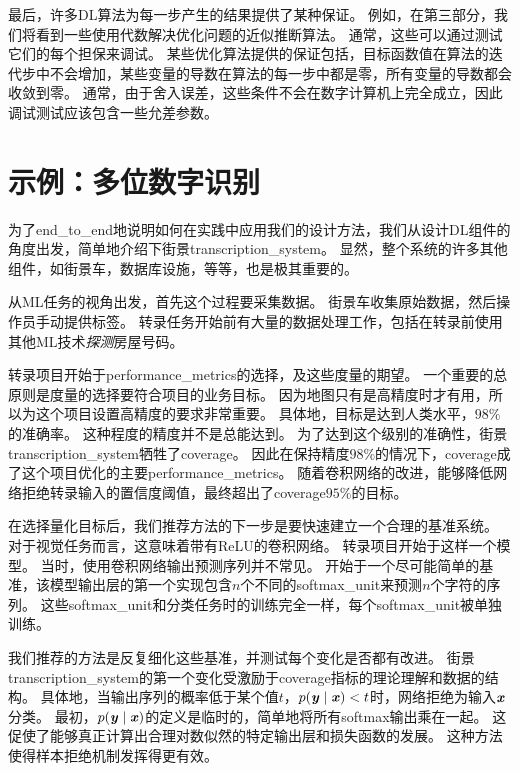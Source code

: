 
最后，许多\gls{DL}算法为每一步产生的结果提供了某种保证。
例如，在第三部分，我们将看到一些使用代数解决优化问题的近似推断算法。
通常，这些可以通过测试它们的每个担保来调试。
某些优化算法提供的保证包括，目标函数值在算法的迭代步中不会增加，某些变量的导数在算法的每一步中都是零，所有变量的导数都会收敛到零。
通常，由于舍入误差，这些条件不会在数字计算机上完全成立，因此调试测试应该包含一些允差参数。

\section{示例：多位数字识别}
\label{sec:example_multi_digit_number_recognition}
为了\gls{end_to_end}地说明如何在实践中应用我们的设计方法，我们从设计\gls{DL}组件的角度出发，简单地介绍下街景\gls{transcription_system}。
显然，整个系统的许多其他组件，如街景车，数据库设施，等等，也是极其重要的。

从\gls{ML}任务的视角出发，首先这个过程要采集数据。
街景车收集原始数据，然后操作员手动提供标签。
转录任务开始前有大量的数据处理工作，包括在转录前使用其他\gls{ML}技术\emph{探测}房屋号码。

转录项目开始于\gls{performance_metrics}的选择，及这些度量的期望。
一个重要的总原则是度量的选择要符合项目的业务目标。
因为地图只有是高精度时才有用，所以为这个项目设置高精度的要求非常重要。
具体地，目标是达到人类水平，$98\%$的准确率。
这种程度的精度并不是总能达到。
为了达到这个级别的准确性，街景\gls{transcription_system}牺牲了\gls{coverage}。
因此在保持精度$98\%$的情况下，\gls{coverage}成了这个项目优化的主要\gls{performance_metrics}。
随着卷积网络的改进，能够降低网络拒绝转录输入的置信度阈值，最终超出了\gls{coverage}$95\%$的目标。


在选择量化目标后，我们推荐方法的下一步是要快速建立一个合理的基准系统。
对于视觉任务而言，这意味着带有\gls{ReLU}的卷积网络。
转录项目开始于这样一个模型。
当时，使用卷积网络输出预测序列并不常见。
开始于一个尽可能简单的基准，该模型输出层的第一个实现包含$n$个不同的\gls{softmax_unit}来预测$n$个字符的序列。
这些\gls{softmax_unit}和分类任务时的训练完全一样，每个\gls{softmax_unit}被单独训练。


我们推荐的方法是反复细化这些基准，并测试每个变化是否都有改进。
街景\gls{transcription_system}的第一个变化受激励于\gls{coverage}指标的理论理解和数据的结构。
具体地，当输出序列的概率低于某个值$t$，$p(\boldsymbol{\mathit{y}}\mid\boldsymbol{\mathit{x}}) < t$时，网络拒绝为输入$\boldsymbol{\mathit{x}}$分类。
最初，$p(\boldsymbol{\mathit{y}}\mid\boldsymbol{\mathit{x}})$的定义是临时的，简单地将所有\gls{softmax}输出乘在一起。
这促使了能够真正计算出合理对数似然的特定输出层和损失函数的发展。
这种方法使得样本拒绝机制发挥得更有效。


